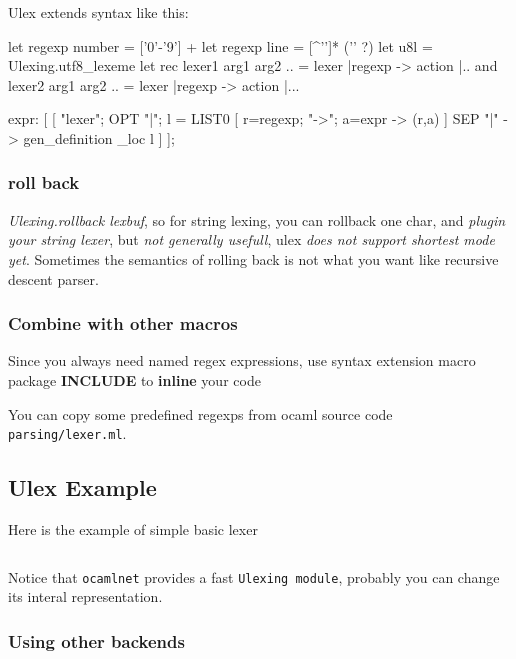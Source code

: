 Ulex extends syntax  like this:

\begin{ocamlcode} 
let regexp number = ['0'-'9'] + 
let regexp line = [^'\n']* ('\n' ?)  
let u8l = Ulexing.utf8_lexeme 
let rec lexer1 arg1 arg2 .. = lexer 
   |regexp -> action |..  
and lexer2 arg1 arg2 .. = lexer
   |regexp -> action |...
\end{ocamlcode}

\begin{ocamlcode}
 expr: [
  [ "lexer";
     OPT "|"; l = LIST0 [ r=regexp; "->"; a=expr -> (r,a) ] SEP "|" ->
       gen_definition _loc l ]
 ];
\end{ocamlcode}

\subsubsection{roll back}
\label{roll back}

\textit{Ulexing.rollback lexbuf}, so for string lexing, you can
rollback one char, and \textit{plugin your string lexer}, but
\textit{not generally usefull}, ulex \textit{does not support shortest
  mode yet}. Sometimes the semantics of rolling back is not what you
want like recursive descent parser.

\subsubsection{Combine with other macros}
\label{Combine with other macros}

Since you always need named regex expressions,
use syntax extension macro package \textbf{INCLUDE} to
\textbf{ inline} your code

You can copy some predefined regexps from ocaml source code
\verb| parsing/lexer.ml|.




\subsection{Ulex Example}

Here is the example of simple basic lexer 
\inputminted[fontsize=\scriptsize]{ocaml}{code/lexing/basic_ulex.ml}

Notice that \verb|ocamlnet| provides a fast \verb|Ulexing module|,
probably you can change its interal representation.

\subsubsection{Using other backends}
\label{Using other backends}
\inputminted[fontsize=\scriptsize]{ocaml}{code/lexing/test_net_ulex.ml}

